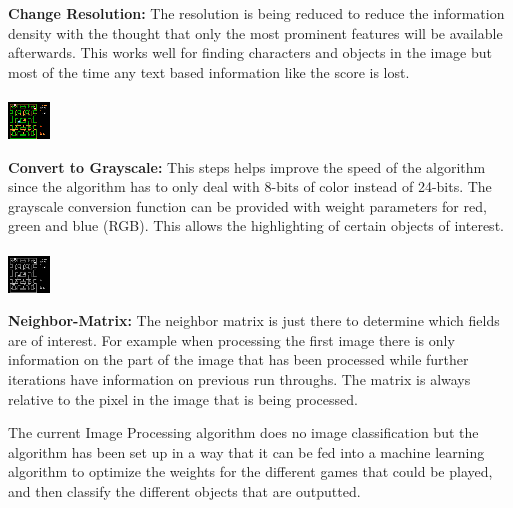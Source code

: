 \documentclass[12pt,journal,compsoc]{IEEEtran}
\begin{document}
\textbf{Change Resolution:}
The resolution is being reduced to reduce the information density with the thought that only the most prominent features will be available afterwards. This works well for finding characters and objects in the image but most of the time any text based information like the score is lost.\\ \\
\includegraphics[scale=3]{6xdown}

\textbf{Convert to Grayscale:}
This steps helps improve the speed of the algorithm since the algorithm has to only deal with 8-bits of color instead of 24-bits. The grayscale conversion function can be provided with weight parameters for red, green and blue (RGB). This allows the highlighting of certain objects of interest.\\ \\
\includegraphics[scale=3]{gray}

\textbf{Neighbor-Matrix:}
The neighbor matrix is just there to determine which fields are of interest. For example when processing the first image there is only information on the part of the image that has been processed while further iterations have information on previous run throughs. The matrix is always relative to the pixel in the image that is being processed.

    The current Image Processing algorithm does no image classification but the algorithm has been set up in a way that it can be fed into a machine learning algorithm to optimize the weights for the different games that could be played, and then classify the different objects that are outputted.
\end{document}
